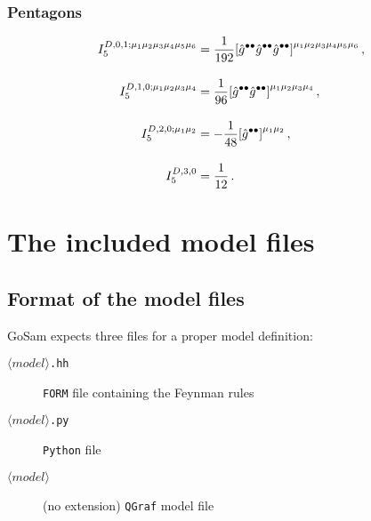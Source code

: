 \documentclass[11pt,a4paper]{refrep}
\newcommand{\gosamversion}{{3{.}0}}
\newcommand{\gosamv}[1][\gosamversion]{{\sc GoSam}\xspace}
\newcommand{\qgraf}{{\tt QGraf}\xspace}
\newcommand{\form}{{\tt FORM}\xspace}
\newcommand{\python}{{\tt Python}\xspace}
\begin{document}
\subsection*{Pentagons}
\begin{subequations}
\begin{align}
  I_5^{D,0,1;\mu_1\mu_2\mu_3\mu_4\mu_5\mu_6} &= \frac{1}{192}\qty[\hat{g}^{\bullet\bullet}\hat{g}^{\bullet\bullet}\hat{g}^{\bullet\bullet}]^{\mu_1\mu_2\mu_3\mu_4\mu_5\mu_6}\,,\\[10pt]
%
  I_5^{D,1,0;\mu_1\mu_2\mu_3\mu_4} &= \frac{1}{96}\qty[\hat{g}^{\bullet\bullet}\hat{g}^{\bullet\bullet}]^{\mu_1\mu_2\mu_3\mu_4}\,,\\[10pt]
%
  I_5^{D,2,0;\mu_1\mu_2} &= -\frac{1}{48}\qty[\hat{g}^{\bullet\bullet}]^{\mu_1\mu_2}\,,\\[10pt]
%
  I_5^{D,3,0} &= \frac{1}{12}\,.
\end{align}
\end{subequations}

\chapter{The included model files}
\label{chp:model-files}

\section{Format of the model files}\label{sec:modelfiles}
\gosamv{} expects three files for a proper model definition:
\begin{description}
\item[$\langle model\rangle$\texttt{.hh}] \form{} file containing the Feynman rules
\item[$\langle model\rangle$\texttt{.py}] \python{} file
\item[$\langle model\rangle$] (no extension) \qgraf{} model file
\end{description}
\end{document}
